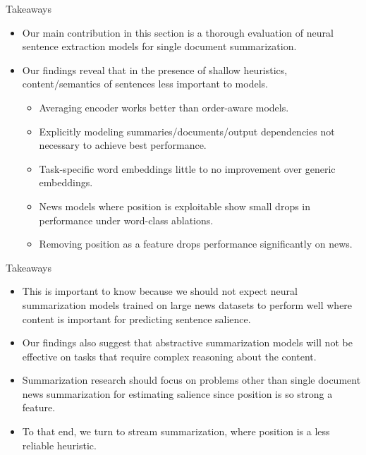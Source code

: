 \begin{frame}{Takeaways}


    \begin{itemize}
        \item Our main contribution in this section is a thorough evaluation of neural sentence extraction
models for single document summarization.
\vspace{10pt}
        \item Our findings reveal that
            in the presence of shallow heuristics, content/semantics of sentences
        less important to models.
        \begin{itemize}
            \item Averaging encoder works better than order-aware models.
            \item Explicitly modeling summaries/documents/output dependencies not necessary to achieve best performance.
            \item Task-specific word embeddings little to no improvement over
                 generic embeddings.
            \item News models where position is exploitable show small drops in performance  under word-class ablations.
            \item Removing position as a feature drops performance significantly on news.
         \end{itemize}
         \vspace{10pt}

    \end{itemize}
 \end{frame}

 \begin{frame}{Takeaways}

     \begin{itemize}

        \item This is important to know because we should not expect neural summarization models
            trained on large news datasets  to 
            perform well where content is important for predicting sentence salience.
         \vspace{10pt}

     \item Our findings also suggest that abstractive summarization models will not be effective on tasks
         that require complex reasoning about the content.
         \vspace{10pt}
     \item Summarization research should focus on problems other
         than single document news summarization for estimating salience
         since position is so strong a feature.

         \vspace{10pt}

     \item  To that end, we turn to stream summarization, where position
         is a less reliable heuristic.


 \end{itemize}
 \end{frame}


